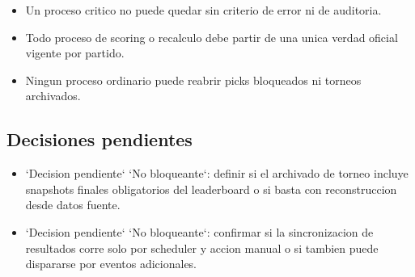 \begin{itemize}
  \item Un proceso critico no puede quedar sin criterio de error ni de auditoria.
  \item Todo proceso de scoring o recalculo debe partir de una unica verdad oficial vigente por partido.
  \item Ningun proceso ordinario puede reabrir picks bloqueados ni torneos archivados.
\end{itemize}

\subsection{Decisiones pendientes}

\begin{itemize}
  \item `Decision pendiente` `No bloqueante`: definir si el archivado de torneo incluye snapshots finales obligatorios del leaderboard o si basta con reconstruccion desde datos fuente.
  \item `Decision pendiente` `No bloqueante`: confirmar si la sincronizacion de resultados corre solo por scheduler y accion manual o si tambien puede dispararse por eventos adicionales.
\end{itemize}

